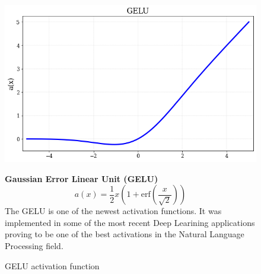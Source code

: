 \begin{figure}[!h]
\begin{minipage}{0.45\textwidth}
    \centering
\includegraphics[width=\textwidth]{sections/03/Images/GELU.png}
\caption{GELU activation function}
    \label{fig:gelu}
\end{minipage}
\hfill
\begin{minipage}{0.5\textwidth}
    \textbf{Gaussian Error Linear Unit (GELU)}
   \begin{equation}
       a(x) = \frac{1}{2} x \left( 1+\text{erf} \left( \frac{x}{\sqrt{2}}\right)\right)
   \end{equation}
   The GELU\cite{gelu} is one of the newest activation functions. It was implemented in some of the most recent Deep Learining applications proving to be one of the best activations in the Natural Language Processing field\cite{bert,gpt}. 
\end{minipage}
\end{figure}  


